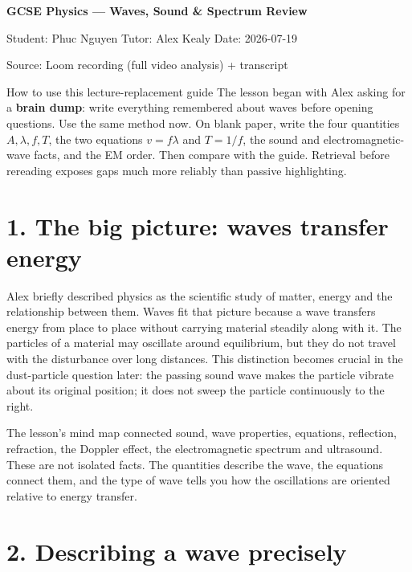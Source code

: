 \documentclass[11pt,a4paper]{article}
\begin{document}
\begin{center}
{\LARGE\bfseries GCSE Physics --- Waves, Sound \& Spectrum Review}\par\vspace{2mm}
{\color{muted}Student: Phuc Nguyen \quad Tutor: Alex Kealy \quad Date: 2026-07-19}\par
{\small\color{muted}Source: Loom recording (full video analysis) + transcript}
\end{center}

\begin{keybox}{How to use this lecture-replacement guide}
The lesson began with Alex asking for a \textbf{brain dump}: write everything remembered about waves before opening questions. Use the same method now. On blank paper, write the four quantities $A,\lambda,f,T$, the two equations $v=f\lambda$ and $T=1/f$, the sound and electromagnetic-wave facts, and the EM order. Then compare with the guide. Retrieval before rereading exposes gaps much more reliably than passive highlighting.
\end{keybox}

\section*{1. The big picture: waves transfer energy}
Alex briefly described physics as the scientific study of matter, energy and the relationship between them. Waves fit that picture because a wave transfers energy from place to place without carrying material steadily along with it. The particles of a material may oscillate around equilibrium, but they do not travel with the disturbance over long distances. This distinction becomes crucial in the dust-particle question later: the passing sound wave makes the particle vibrate about its original position; it does not sweep the particle continuously to the right.

The lesson's mind map connected sound, wave properties, equations, reflection, refraction, the Doppler effect, the electromagnetic spectrum and ultrasound. These are not isolated facts. The quantities describe the wave, the equations connect them, and the type of wave tells you how the oscillations are oriented relative to energy transfer.

\section*{2. Describing a wave precisely}
\end{document}
